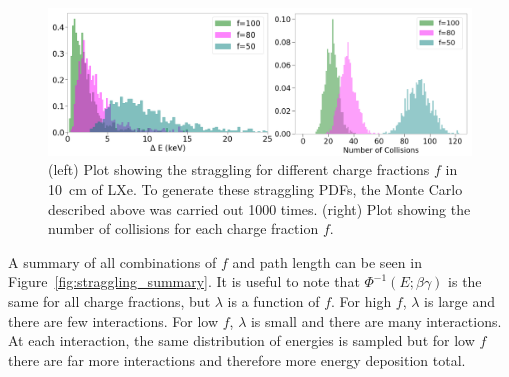  \begin{figure}[htbp]
\begin{center}
\includegraphics[width=\textwidth]{figures/lips/straggling_xe_examples.png}
\caption{(left) Plot showing the straggling for different charge fractions $f$ in 10~cm of \acs{LXe}. To generate these straggling \acs{PDF}s, the Monte Carlo described above was carried out 1000 times. (right) Plot showing the number of collisions for each charge fraction $f$.  }
\label{fig:lip_straggling_examples}
\end{center}
\end{figure}

A summary of all combinations of $f$ and path length can be seen in Figure~\ref{fig:straggling_summary}. It is useful to note that $\Phi^{-1}(E; \beta \gamma)$ is the same for all charge fractions, but $\lambda$ is a function of $f$. For high $f$, $\lambda$ is large and there are few interactions. For low $f$, $\lambda$ is small and there are many interactions. At each interaction, the same distribution of energies is sampled but for low $f$ there are far more interactions and therefore more energy deposition total. 


